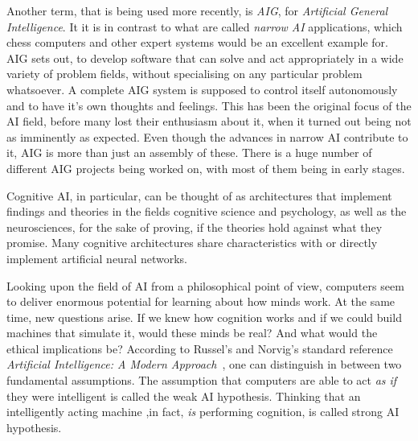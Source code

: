 
Another term, that is being used more recently, is \emph{AIG}, for \emph{Artificial General Intelligence}. It it is in contrast to what are called \emph{narrow AI} applications, which chess computers and other expert systems would be an excellent example for. AIG sets out, to develop software that can solve and act appropriately in a wide variety of problem fields, without specialising on any particular problem whatsoever. A complete AIG system is supposed to control itself autonomously and to have it's own thoughts and feelings. This has been the original focus of the AI field, before many lost their enthusiasm about it, when it turned out being not as imminently as expected. Even though the advances in narrow AI contribute to it, AIG is more than just an assembly of these. There is a huge number of different AIG projects being worked on, with most of them being in early stages.~\cite{goertzel2007artificial}



Cognitive AI, in particular, can be thought of as architectures that implement findings and theories in the fields cognitive science and psychology, as well as the neurosciences, for the sake of proving, if the theories hold against what they promise. Many cognitive architectures share characteristics with or directly implement artificial neural networks.


Looking upon the field of AI from a philosophical point of view, computers seem to deliver enormous potential for learning about how minds work. At the same time, new questions arise. If we knew how cognition works and if we could build machines that simulate it, would these minds be real? And what would the ethical implications be? According to Russel's and Norvig's standard reference \emph{Artificial Intelligence: A Modern Approach}~\cite{russell2009artificial}, one can distinguish in between two fundamental assumptions. The assumption that computers are able to act \emph{as if} they were intelligent is called the weak AI hypothesis. Thinking that an intelligently acting machine ,in fact, \emph{is} performing cognition, is called strong AI hypothesis.

